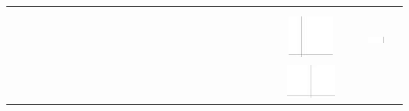 \documentclass[10pt]{article}
\begin{document}
\begin{center}
\begin{tabular}{|c|c|c|c|c|c|c|c|c|c|c|c|c|c|c|c|c|c|c|c|c|c|c|c|c|c|c|c|c|c|}
 &  \\
\hline
 &  &  &  &  &  &  &  &  &  &  &  &  &  &  &  &  &  &  &  &  &  &  &  &  &  &  &  &  &  \\
\hline
 &  &  &  &  &  &  &  &  &  &  &  &  &  &  &  &  &  &  &  &  &  &  &  &  &  &  &  &  &  \\
\hline
 &  &  &  &  &  &  &  &  &  &  &  &  &  &  &  &  &  &  &  &  &  &  &  &  & \includegraphics[max width=\textwidth]{2024_11_21_94f02db55673a8a7b820g-12(2)}
 &  &  & \includegraphics[max width=\textwidth]{2024_11_21_94f02db55673a8a7b820g-12(8)}
 &  \\
\hline
 &  &  &  &  &  &  &  &  &  &  &  &  &  &  &  &  &  &  &  &  &  &  &  &  & \includegraphics[max width=\textwidth]{2024_11_21_94f02db55673a8a7b820g-12(5)}

\end{tabular}
\end{center}
\end{document}
